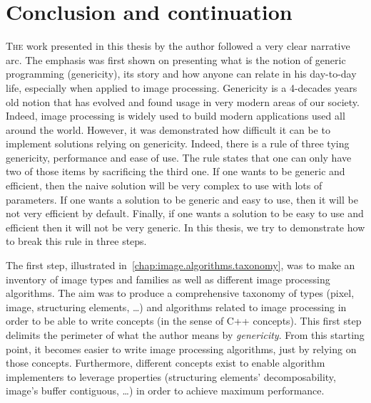\chapter{Conclusion and continuation}
\label{chap:conclusion}

\lettrine[lines=2]{T}{he} work presented in this thesis by the author followed a very clear narrative arc. The emphasis
was first shown on presenting what is the notion of generic programming (genericity), its story and how anyone can
relate in his day-to-day life, especially when applied to image processing. Genericity is a 4-decades years old notion
that has evolved and found usage in very modern areas of our society. Indeed, image processing is widely used to build
modern applications used all around the world. However, it was demonstrated how difficult it can be to implement
solutions relying on genericity. Indeed, there is a rule of three tying genericity, performance and ease of use. The
rule states that one can only have two of those items by sacrificing the third one. If one wants to be generic and
efficient, then the naive solution will be very complex to use with lots of parameters. If one wants a solution to be
generic and easy to use, then it will be not very efficient by default. Finally, if one wants a solution to be easy to
use and efficient then it will not be very generic. In this thesis, we try to demonstrate how to break this rule in
three steps.

The first step, illustrated in~\cref{chap:image.algorithms.taxonomy}, was to make an inventory of image types and
families as well as different image processing algorithms. The aim was to produce a comprehensive taxonomy of types
(pixel, image, structuring elements, \ldots) and algorithms related to image processing in order to be able to write
concepts (in the sense of C++ concepts). This first step delimits the perimeter of what the author means by
\emph{genericity}. From this starting point, it becomes easier to write image processing algorithms, just by relying on
those concepts. Furthermore, different concepts exist to enable algorithm implementers to leverage properties
(structuring elements' decomposability, image's buffer contiguous, \ldots) in order to achieve maximum performance.

